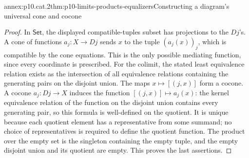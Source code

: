\begin{annexitem}{annex:p10.cat.2}{thm:p10-limits-products-equalizers}{Constructing a diagram's universal cone and cocone}
\begin{proof}
In \(\mathsf{Set}\), the displayed compatible-tuples subset
has projections to the \(D j\)'s.  A cone of functions \(a_j:X\to D j\)
sends \(x\) to the tuple \((a_j(x))_j\), which is compatible by
the cone equations.  This is the only possible mediating
function, since every coordinate is prescribed.
For the colimit, the stated least equivalence relation exists
as the intersection of all equivalence relations containing
the generating pairs on the disjoint union.
The maps \(x\mapsto[(j,x)]\) form a cocone.
A cocone \(a_j:D j\to X\) induces the function
\([(j,x)]\mapsto a_j(x)\): the kernel equivalence relation of
the function on the disjoint union contains every generating
pair, so this formula is well-defined on the quotient.
It is unique because each quotient element has a representative
from some summand; no choice of representatives is required to
define the quotient function.
The product over the empty set is the singleton containing the
empty tuple, and the empty disjoint union and its quotient are
empty.  This proves the last assertions.
\end{proof}
\end{annexitem}

